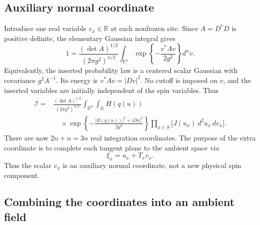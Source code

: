 \documentclass[11pt]{article}
\newcommand{\R}{\mathbb R}
\numberwithin{equation}{section}
\theoremstyle{definition}
\theoremstyle{plain}
\begin{document}
\subsection{Auxiliary normal coordinate}

Introduce one real variable $v_x\in\R$ at each nonfrozen site.
Since $A=D^*D$ is positive definite, the elementary
Gaussian integral gives
\begin{equation}
 1=\frac{(\det A)^{1/2}}{(2\pi g^2)^{n/2}}
       \int_{\R^n}\exp\!\left\{-\frac{v^*Av}{2g^2}\right\}d^nv.
 \label{eq:scalar-one}
\end{equation}
Equivalently, the inserted probability law is a centered scalar
Gaussian with covariance $g^2A^{-1}$.  Its energy is
$v^*Av=|Dv|^2$.  No cutoff is imposed on $v$, and
the inserted variables are initially independent of the spin variables.
Thus
\begin{equation}
 \begin{aligned}
 \mathcal I={}&\frac{(\det A)^{1/2}}{(2\pi g^2)^{n/2}}
 \int_{\R^n}\int_{\mathcal U} H(q(u))\\
 &\quad\times
 \exp\!\left\{-\frac{|R(q(u))|^2+|Dv|^2}{2g^2}\right\}
 \prod_{x\in S}\bigl[J(u_x)\,d^2u_x\, dv_x\bigr].
 \label{eq:uv-integral}
 \end{aligned}
\end{equation}
There are now $2n+n=3n$ real integration coordinates.
The purpose of the extra coordinate is
to complete each tangent plane to the ambient space via
\begin{equation}
\xi_x=u_x+T_xv_x
.
\end{equation}
Thus the scalar $v_x$ is an auxiliary normal coordinate, not a new physical spin component.

\subsection{Combining the coordinates into an ambient field}
\end{document}

